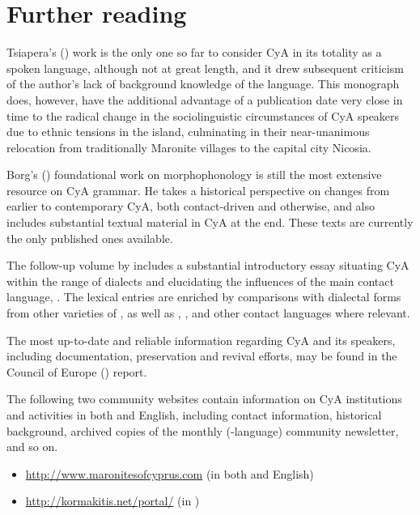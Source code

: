 \documentclass[output=paper]{langsci/langscibook}
\begin{document}
\section*{Further reading}\label{FR}
\begin{furtherreading}
\item[Tsiapera's (\citeyear{Tsiapera1969})] work is the only one so far to consider CyA in its totality as a spoken language, although not at great length, and it drew subsequent criticism of the author’s lack of background knowledge of the  language. This monograph does, however, have the additional advantage of a publication date very close in time to the radical change in the sociolinguistic circumstances of CyA speakers due to ethnic tensions in the island, culminating in their near-unanimous relocation from traditionally Maronite villages to the capital city Nicosia.
\item[Borg's (\citeyear{Borg1985})] foundational work on morphophonology is still the most extensive resource on CyA grammar. He takes a historical perspective on changes from earlier  to contemporary CyA, both contact-driven and otherwise, and also includes substantial textual material in CyA at the end. These texts are currently the only published ones available.
\item[The follow-up volume by \citet{Borg2004}] includes a substantial introductory essay situating CyA within the range of  dialects and elucidating the influences of the main contact language, . The lexical entries are enriched by comparisons with dialectal forms from other varieties of , as well as , , and other contact languages where relevant.
\item[The most up-to-date] and reliable information regarding CyA and its speakers, including documentation, preservation and revival efforts, may be found in the Council of Europe (\citeyear{CouncilofEurope2017}) report.
\item[The following two community websites]\sloppy contain information on CyA institutions and activities in both  and English, including contact information, historical background, archived copies of the monthly (-language) community newsletter, and so on.

\begin{itemize}
\item \url{http://www.maronitesofcyprus.com} (in both  and English)
\item \url{http://kormakitis.net/portal/} (in )
\end{itemize}
\end{furtherreading}
\end{document}
